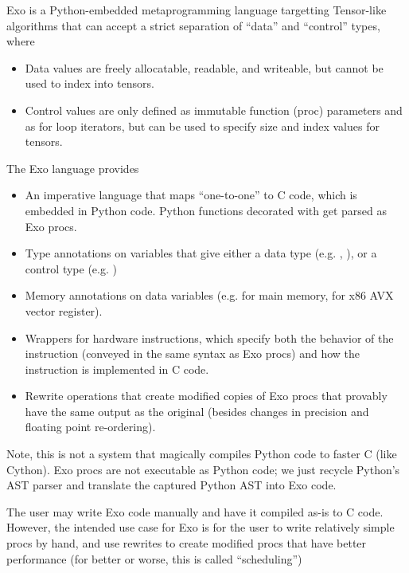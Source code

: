 




Exo is a Python-embedded metaprogramming language targetting Tensor-like algorithms that can accept a strict separation of ``data'' and ``control'' types, where
\begin{itemize}
  \item Data values are freely allocatable, readable, and writeable, but cannot be used to index into tensors.
  \item Control values are only defined as immutable function (proc) parameters and as for loop iterators, but can be used to specify size and index values for tensors.
\end{itemize}

\filbreak
The Exo language provides
\begin{itemize}
  \item An imperative language that maps ``one-to-one'' to C code, which is embedded in Python code.
    Python functions decorated with  get parsed as Exo procs.
  \filbreak
  \item Type annotations on variables that give either a data type (e.g. , ), or a control type (e.g. )
  \filbreak
  \item Memory annotations on data variables (e.g.  for main memory,  for x86 AVX vector register).
  \filbreak
  \item Wrappers for hardware instructions, which specify both the behavior of the instruction (conveyed in the same syntax as Exo procs) and how the instruction is implemented in C code.
  \filbreak
  \item Rewrite operations that create modified copies of Exo procs that provably have the same output as the original (besides changes in precision and floating point re-ordering).
\end{itemize}

\filbreak
Note, this is not a system that magically compiles Python code to faster C (like Cython).
Exo procs are not executable as Python code; we just recycle Python's AST parser and translate the captured Python AST into Exo code.

\filbreak
The user may write Exo code manually and have it compiled as-is to C code.
However, the intended use case for Exo is for the user to write relatively simple procs by hand, and use rewrites to create modified procs that have better performance (for better or worse, this is called ``scheduling'')

